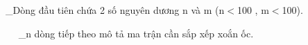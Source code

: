 \_Dòng đầu tiên chứa 2 số nguyên dương n và m (n$<$100 , m$<$100).

   \_n dòng tiếp theo mô tả ma trận cần sắp xếp xoắn ốc.